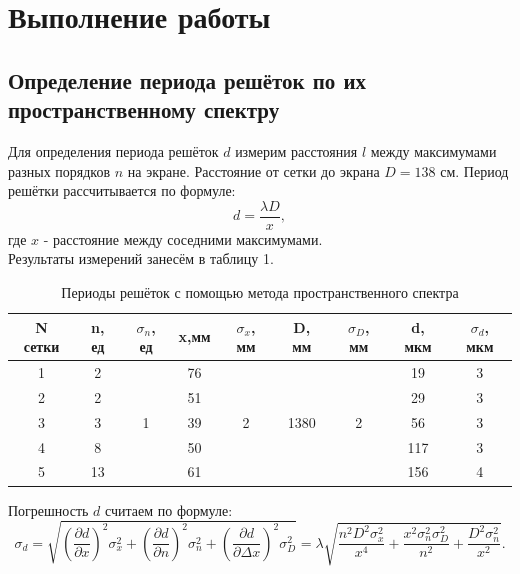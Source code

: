 \documentclass[a4paper,12pt]{report}
\begin{document}
\newpage
\section*{{Выполнение работы}}
\subsection*{Определение периода решёток по их пространственному спектру}
    Для определения периода решёток $d$ измерим расстояния $l$ между максимумами разных порядков $n$ на экране. Расстояние от сетки до экрана $D = 138 $ см. Период решётки рассчитывается по формуле: 
    \begin{equation*}
        d = \frac{\lambda D}{x}, 
    \end{equation*}
    где $x$ - расстояние между соседними максимумами.\\
    Результаты измерений занесём в таблицу 1.
    
\begin{table}[h!]
  \centering
    \begin{center}
    \caption{Периоды решёток с помощью метода пространственного спектра}
    \end{center}
\begin{tabular}{|c|c|c|c|c|c|c|c|c|}
\hline
N сетки & n, ед & $\sigma_{n}$, ед        & x,мм & $\sigma_{x}$, мм        & D, мм                 & $\sigma_{D}$, мм        & d, мкм & $\sigma_{d}$, мкм \\ \hline
1       & 2     & \multirow{5}{*}{1} & 76   & \multirow{5}{*}{2} & \multirow{5}{*}{1380} & \multirow{5}{*}{2} & 19     & 3            \\ \cline{1-2} \cline{4-4} \cline{8-9} 
2       & 2     &                    & 51   &                    &                       &                    & 29     & 3            \\ \cline{1-2} \cline{4-4} \cline{8-9} 
3       & 3     &                    & 39   &                    &                       &                    & 56     & 3            \\ \cline{1-2} \cline{4-4} \cline{8-9} 
4       & 8     &                    & 50   &                    &                       &                    & 117    & 3            \\ \cline{1-2} \cline{4-4} \cline{8-9} 
5       & 13    &                    & 61   &                    &                       &                    & 156    & 4            \\ \hline
\end{tabular}
\end{table}
Погрешность $d$ считаем по формуле:
$$
\sigma_{d} = \sqrt{\left(\dfrac{\partial d}{\partial  x}\right)^2 \sigma^2_{x} + \left(\dfrac{\partial d}{\partial n}\right)^2 \sigma^2_{n} + \left(\dfrac{\partial d}{\partial \Delta x}\right)^2 \sigma^2_{D}} =\lambda \sqrt{\dfrac{n^2 D^2 \sigma^2_{x}}{x^4} + \dfrac{x^2 \sigma^2_{n} \sigma^2_{D}}{n^2} + \dfrac{D^2 \sigma^2_{n}}{x^2}}.
$$
\end{document}
